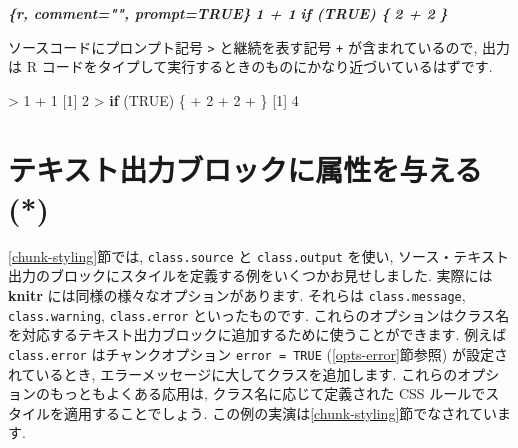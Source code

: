 \documentclass[
  11pt,
]{bxjsreport}
\newenvironment{Shaded}{\begin{snugshade}}{\end{snugshade}}
\newcommand{\ConstantTok}[1]{\textcolor[rgb]{0.00,0.00,0.00}{#1}}
\newcommand{\ControlFlowTok}[1]{\textcolor[rgb]{0.13,0.29,0.53}{\textbf{#1}}}
\newcommand{\DecValTok}[1]{\textcolor[rgb]{0.00,0.00,0.81}{#1}}
\newcommand{\InformationTok}[1]{\textcolor[rgb]{0.56,0.35,0.01}{\textbf{\textit{#1}}}}
\newcommand{\NormalTok}[1]{#1}
\newcommand{\SpecialCharTok}[1]{\textcolor[rgb]{0.00,0.00,0.00}{#1}}
\begin{document}
\begin{Shaded}
\begin{Highlighting}[]
\InformationTok{\textasciigrave{}\textasciigrave{}\textasciigrave{}\{r, comment="", prompt=TRUE\}}
\InformationTok{1 + 1}
\InformationTok{if (TRUE) \{}
\InformationTok{  2 + 2}
\InformationTok{\}}
\InformationTok{\textasciigrave{}\textasciigrave{}\textasciigrave{}}
\end{Highlighting}
\end{Shaded}

ソースコードにプロンプト記号 \texttt{\textgreater{}} と継続を表す記号 \texttt{+} が含まれているので, 出力は R コードをタイプして実行するときのものにかなり近づいているはずです.

\begin{Shaded}
\begin{Highlighting}[numbers=left,,]
\SpecialCharTok{\textgreater{}} \DecValTok{1} \SpecialCharTok{+} \DecValTok{1}
\NormalTok{[}\DecValTok{1}\NormalTok{] }\DecValTok{2}
\SpecialCharTok{\textgreater{}} \ControlFlowTok{if}\NormalTok{ (}\ConstantTok{TRUE}\NormalTok{) \{}
\SpecialCharTok{+}   \DecValTok{2} \SpecialCharTok{+} \DecValTok{2}
\SpecialCharTok{+}\NormalTok{ \}}
\NormalTok{[}\DecValTok{1}\NormalTok{] }\DecValTok{4}
\end{Highlighting}
\end{Shaded}

\hypertarget{attr-output}{%
\section{テキスト出力ブロックに属性を与える (*)}\label{attr-output}}

\ref{chunk-styling}節では, \texttt{class.source} と \texttt{class.output} を使い, ソース・テキスト出力のブロックにスタイルを定義する例をいくつかお見せしました. 実際には \textbf{knitr} には同様の様々なオプションがあります. それらは \texttt{class.message}, \texttt{class.warning}, \texttt{class.error} といったものです. これらのオプションはクラス名を対応するテキスト出力ブロックに追加するために使うことができます. 例えば \texttt{class.error} はチャンクオプション \texttt{error = TRUE} (\ref{opts-error}節参照) が設定されているとき, エラーメッセージに大してクラスを追加します. これらのオプションのもっともよくある応用は, クラス名に応じて定義された CSS ルールでスタイルを適用することでしょう. この例の実演は\ref{chunk-styling}節でなされています.
\end{document}
